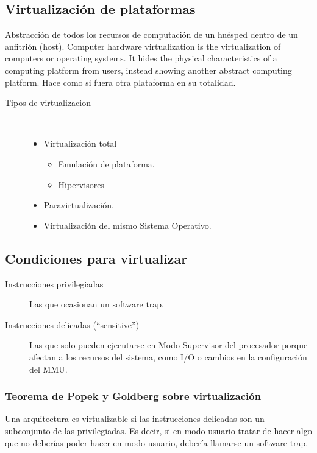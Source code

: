 \documentclass[a4paper, twoside]{article}
\begin{document}
\subsection{Virtualización de plataformas}
Abstracción de todos los recursos de computación de un huésped dentro de un anfitrión (host). Computer hardware virtualization is the virtualization of computers or operating systems. It hides the physical characteristics of a computing platform from users, instead showing another abstract computing platform. Hace como si fuera otra plataforma en su totalidad.

\begin{description}
	\item[Tipos de virtualizacion] ~
	\begin{itemize}
		\item Virtualización total
		\begin{itemize}
			\item Emulación de plataforma.
			\item Hipervisores
		\end{itemize}
		\item Paravirtualización.
		\item Virtualización del mismo Sistema Operativo.
	\end{itemize}
\end{description}

\subsection{Condiciones para virtualizar}
\begin{description}
	\item[Instrucciones privilegiadas] Las que ocasionan un software trap.
	\item[Instrucciones delicadas (``sensitive'')] Las que solo pueden ejecutarse en Modo Supervisor del procesador porque afectan a los recursos del sistema, como I/O o cambios en la configuración del MMU.
\end{description}

\subsubsection{Teorema de Popek y Goldberg sobre virtualización}
Una arquitectura es virtualizable si las instrucciones delicadas son un subconjunto de las privilegiadas. Es decir, si en modo usuario tratar de hacer algo que no deberías poder hacer en modo usuario, debería llamarse un software trap.
\end{document}
